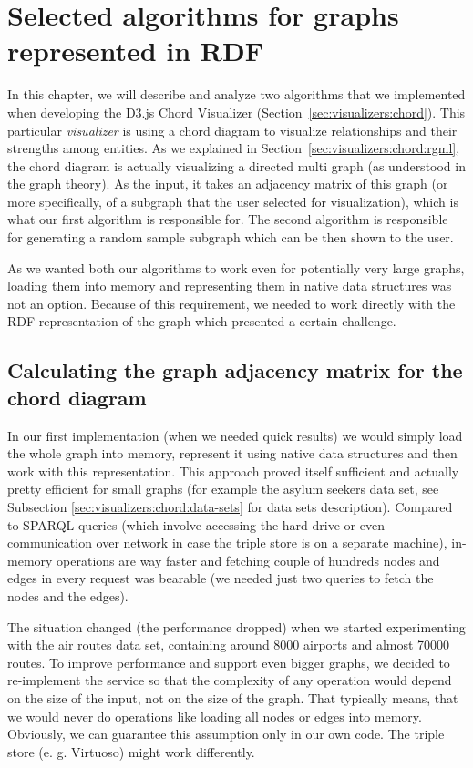 \chapter{Selected algorithms for graphs represented in RDF}
\label{chap:theoretical-attachment}

In this chapter, we will describe and analyze two algorithms that we implemented when developing the D3.js Chord Visualizer (Section~\ref{sec:visualizers:chord}). This particular \emph{visualizer} is using a chord diagram to visualize relationships and their strengths among entities. As we explained in Section~\ref{sec:visualizers:chord:rgml}, the chord diagram is actually visualizing a directed multi graph (as understood in the graph theory). As the input, it takes an adjacency matrix of this graph (or more specifically, of a subgraph that the user selected for visualization), which is what our first algorithm is responsible for. The second algorithm is responsible for generating a random sample subgraph which can be then shown to the user.

As we wanted both our algorithms to work even for potentially very large graphs, loading them into memory and representing them in native data structures was not an option. Because of this requirement, we needed to work directly with the RDF representation of the graph which presented a certain challenge.

\section{Calculating the graph adjacency matrix for the chord diagram}

In our first implementation (when we needed quick results) we would simply load the whole graph into memory, represent it using native data structures and then work with this representation. This approach proved itself sufficient and actually pretty efficient for small graphs (for example the asylum seekers data set, see Subsection \ref{sec:visualizers:chord:data-sets} for data sets description). Compared to SPARQL queries (which involve accessing the hard drive or even communication over network in case the triple store is on a separate machine), in-memory operations are way faster and fetching couple of hundreds nodes and edges in every request was bearable (we needed just two queries to fetch the nodes and the edges).

The situation changed (the performance dropped) when we started experimenting with the air routes data set, containing around 8000 airports and almost 70000 routes. To improve performance and support even bigger graphs, we decided to re-implement the service so that the complexity of any operation would depend on the size of the input, not on the size of the graph. That typically means, that we would never do operations like loading all nodes or edges into memory. Obviously, we can guarantee this assumption only in our own code. The triple store (e. g. Virtuoso) might work differently.

